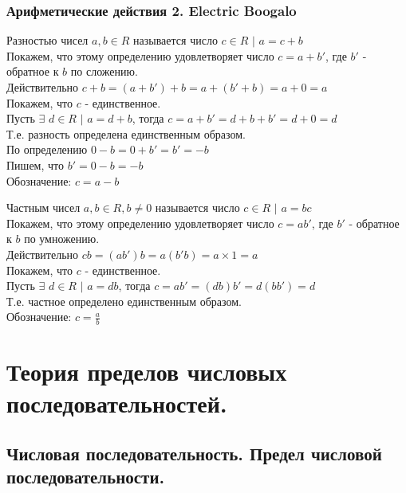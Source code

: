 \documentclass[12pt]{article}
\begin{document}
    \subsubsection*{Арифметические действия 2. Electric Boogalo}
    \noindent Разностью чисел $a,b \in R$ называется число $c \in R$ $|$ $a = c+b$\\
    Покажем, что этому определению удовлетворяет число $c = a + b'$, где $b'$ - обратное к $b$ по сложению.\\
    Действительно $c + b = (a + b') + b = a + (b' + b) = a + 0 = a$\\
    Покажем, что $c$ - единственное.\\
    Пусть $\exists$ $d \in R$ $|$ $a = d + b$, тогда $c = a + b' = d + b + b' = d + 0 = d$\\
    Т.е. разность определена единственным образом.\\
    По определению $0-b = 0+b' = b' = -b$\\
    Пишем, что $b' = 0 - b = -b$\\
    Обозначение: $c = a - b$\par\noindent
    Частным чисел $a,b \in R, b \ne 0$ называется число $c \in R$ $|$ $a = bc$\\
    Покажем, что этому определению удовлетворяет число $c = ab'$, где $b'$ - обратное к $b$ по умножению.\\
    Действительно $cb = (ab')b = a(b'b) = a \times 1 = a$\\
    Покажем, что $c$ - единственное.\\
    Пусть $\exists$ $d \in R$ $|$ $a = db$, тогда $c = ab' = (db)b' = d(bb') = d$\\
    Т.е. частное определено единственным образом.\\
    Обозначение: $c = \frac{a}{b}$

    \section{Теория пределов числовых последовательностей.}

    \subsection{Числовая последовательность. Предел числовой последовательности.}
\end{document}
